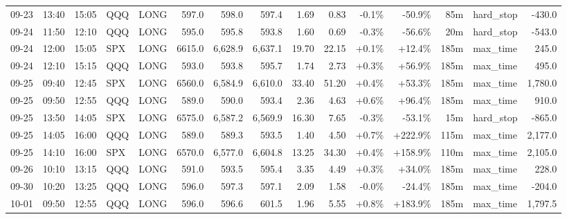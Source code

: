 \documentclass[11pt,a4paper,twoside]{article}
\begin{document}
\begin{landscape}
\begin{center}
\begin{longtable}{>{\color{txtmain}}l l l l l r r r r r r r r >{\color{txtmain}}l r}
09-23 & 13:40 & 15:05 & QQQ & LONG & 597.0 & 598.0 & 597.4 & 1.69 & 0.83 & \textcolor{lossred}{-0.1\%} & \textcolor{lossred}{-50.9\%} & 85m & hard\_stop & \textcolor{lossred}{-430.0} \\
09-24 & 11:50 & 12:10 & QQQ & LONG & 595.0 & 595.8 & 593.8 & 1.60 & 0.69 & \textcolor{lossred}{-0.3\%} & \textcolor{lossred}{-56.6\%} & 20m & hard\_stop & \textcolor{lossred}{-543.0} \\
09-24 & 12:00 & 15:05 & SPX & LONG & 6615.0 & 6,628.9 & 6,637.1 & 19.70 & 22.15 & \textcolor{wingreen}{+0.1\%} & \textcolor{wingreen}{+12.4\%} & 185m & max\_time & \textcolor{wingreen}{245.0} \\
09-24 & 12:10 & 15:15 & QQQ & LONG & 593.0 & 593.8 & 595.7 & 1.74 & 2.73 & \textcolor{wingreen}{+0.3\%} & \textcolor{wingreen}{+56.9\%} & 185m & max\_time & \textcolor{wingreen}{495.0} \\
09-25 & 09:40 & 12:45 & SPX & LONG & 6560.0 & 6,584.9 & 6,610.0 & 33.40 & 51.20 & \textcolor{wingreen}{+0.4\%} & \textcolor{wingreen}{+53.3\%} & 185m & max\_time & \textcolor{wingreen}{1,780.0} \\
09-25 & 09:50 & 12:55 & QQQ & LONG & 589.0 & 590.0 & 593.4 & 2.36 & 4.63 & \textcolor{wingreen}{+0.6\%} & \textcolor{wingreen}{+96.4\%} & 185m & max\_time & \textcolor{wingreen}{910.0} \\
09-25 & 13:50 & 14:05 & SPX & LONG & 6575.0 & 6,587.2 & 6,569.9 & 16.30 & 7.65 & \textcolor{lossred}{-0.3\%} & \textcolor{lossred}{-53.1\%} & 15m & hard\_stop & \textcolor{lossred}{-865.0} \\
09-25 & 14:05 & 16:00 & QQQ & LONG & 589.0 & 589.3 & 593.5 & 1.40 & 4.50 & \textcolor{wingreen}{+0.7\%} & \textcolor{wingreen}{+222.9\%} & 115m & max\_time & \textcolor{wingreen}{2,177.0} \\
09-25 & 14:10 & 16:00 & SPX & LONG & 6570.0 & 6,577.0 & 6,604.8 & 13.25 & 34.30 & \textcolor{wingreen}{+0.4\%} & \textcolor{wingreen}{+158.9\%} & 110m & max\_time & \textcolor{wingreen}{2,105.0} \\
09-26 & 10:10 & 13:15 & QQQ & LONG & 591.0 & 593.5 & 595.4 & 3.35 & 4.49 & \textcolor{wingreen}{+0.3\%} & \textcolor{wingreen}{+34.0\%} & 185m & max\_time & \textcolor{wingreen}{228.0} \\
09-30 & 10:20 & 13:25 & QQQ & LONG & 596.0 & 597.3 & 597.1 & 2.09 & 1.58 & \textcolor{lossred}{-0.0\%} & \textcolor{lossred}{-24.4\%} & 185m & max\_time & \textcolor{lossred}{-204.0} \\
10-01 & 09:50 & 12:55 & QQQ & LONG & 596.0 & 596.6 & 601.5 & 1.96 & 5.55 & \textcolor{wingreen}{+0.8\%} & \textcolor{wingreen}{+183.9\%} & 185m & max\_time & \textcolor{wingreen}{1,797.5} \\

\end{longtable}
\end{center}
\end{landscape}
\end{document}
